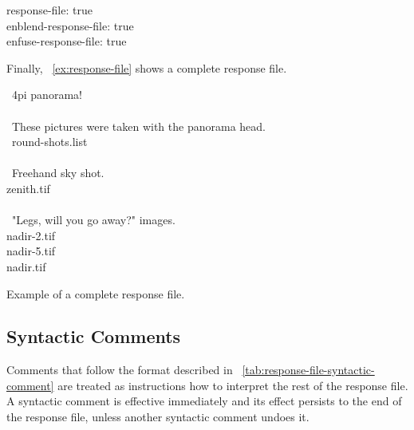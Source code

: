 \begin{literal}
  response-file: true \\
  enblend-response-file: true \\
  enfuse-response-file: true \\
\end{literal}

Finally, \exampleName~\ref{ex:response-file} shows a complete response file.

\begin{exemplar}[htbp]
  \begin{literal}
    ~4\bslash pi panorama! \\
    \mbox{} \\
    ~These pictures were taken with the panorama head. \\
    ~round-shots.list \\
    \mbox{} \\
    ~Freehand sky shot. \\
    zenith.tif \\
    \mbox{} \\
    ~"Legs, will you go away?" images. \\
    nadir-2.tif \\
    nadir-5.tif \\
    nadir.tif \\
  \end{literal}

  \caption[Complete response file]{\label{ex:response-file}Example of a complete response file.}
\end{exemplar}


\subsection[Syntactic Comments]{\label{sec:syntactic-comments}%
  Syntactic Comments}

Comments that follow the format described in
\tableName~\ref{tab:response-file-syntactic-comment} are treated as instructions how to
interpret the rest of the response file.  A syntactic comment is effective immediately and its
effect persists to the end of the response file, unless another syntactic comment undoes it.

